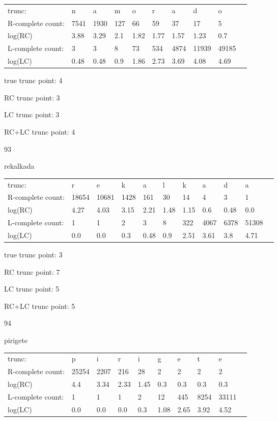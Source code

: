 \documentclass{article}
\begin{document}
\begin{tabular}{l|lllllllll}
trunc: & n & a & m & o & r & a & d & o & \\ 
R-complete count: & 7541 & 1930 & 127 & 66 & 59 & 37 & 17 & 5 & \\ 
log(RC) & 3.88 & 3.29 & 2.1 & 1.82 & 1.77 & 1.57 & 1.23 & 0.7 & \\ 
L-complete count: & 3 & 3 & 8 & 73 & 534 & 4874 & 11939 & 49185 & \\ 
log(LC) & 0.48 & 0.48 & 0.9 & 1.86 & 2.73 & 3.69 & 4.08 & 4.69 & \\ 
\end{tabular}

true trunc point: 4

RC trunc point: 3

LC trunc point: 3

RC+LC trunc point: 4

\newpage

93

rekalkada

\begin{tabular}{l|llllllllll}
trunc: & r & e & k & a & l & k & a & d & a & \\ 
R-complete count: & 18654 & 10681 & 1428 & 161 & 30 & 14 & 4 & 3 & 1 & \\ 
log(RC) & 4.27 & 4.03 & 3.15 & 2.21 & 1.48 & 1.15 & 0.6 & 0.48 & 0.0 & \\ 
L-complete count: & 1 & 1 & 2 & 3 & 8 & 322 & 4067 & 6378 & 51308 & \\ 
log(LC) & 0.0 & 0.0 & 0.3 & 0.48 & 0.9 & 2.51 & 3.61 & 3.8 & 4.71 & \\ 
\end{tabular}

true trunc point: 3

RC trunc point: 7

LC trunc point: 5

RC+LC trunc point: 5

\vspace{1em}

94

pirigete

\begin{tabular}{l|lllllllll}
trunc: & p & i & r & i & g & e & t & e & \\ 
R-complete count: & 25254 & 2207 & 216 & 28 & 2 & 2 & 2 & 2 & \\ 
log(RC) & 4.4 & 3.34 & 2.33 & 1.45 & 0.3 & 0.3 & 0.3 & 0.3 & \\ 
L-complete count: & 1 & 1 & 1 & 2 & 12 & 445 & 8254 & 33111 & \\ 
log(LC) & 0.0 & 0.0 & 0.0 & 0.3 & 1.08 & 2.65 & 3.92 & 4.52 & \\ 
\end{tabular}
\end{document}
